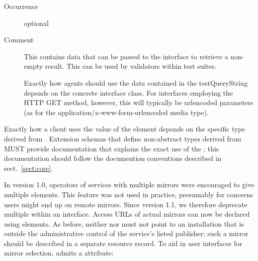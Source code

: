 \documentclass[11pt,a4paper]{ivoa}
\begin{document}
\begin{generated}
\begin{bigdescription}
\begin{description}
\item[Occurrence] optional
\item[Comment]
                  This contains data that can be passed to the interface to
                  retrieve a non-empty result.  This can be used by validators
                  within test suites.

                  Exactly how agents should use the data contained in
                  the testQueryString depends on the concrete interface class.
                  For interfaces employing the HTTP GET method, however,
                  this will typically be urlencoded parameters (as for
                  the application/x-www-form-urlencoded media type).


\end{description}


\end{bigdescription}\endgroup

\endgroup
\end{generated}



Exactly how a client uses the value
of the  element depends on the specific
type derived from .  Extension schemas that
define non-abstract types derived from  MUST
provide documentation that explains the exact use of the
; this documentation should follow the
documention conventions described in sect.~\ref{sect:core}.

In version 1.0, operators of services with multiple mirrors were
encouraged to give multiple  elements.  This feature
was not used in practice, presumably for concerns users might end up on
remote mirrors.  Since version 1.1, we therefore deprecate multiple
 within an interface.  Access URLs of actual mirrors
can now be declared using  elements.
As before, neither
 nor  must not point to an installation
that is outside the administrative control of the service's listed
publisher; such a mirror should be described in a separate resource
record.  To aid in user interfaces for mirror selection,
 admits a  attribute:
\end{document}
